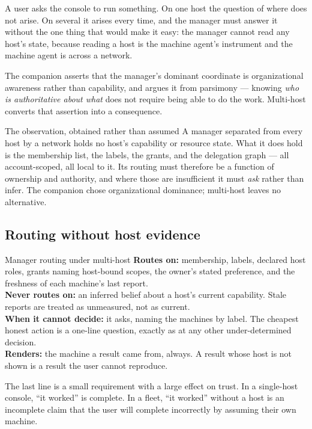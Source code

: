 \documentclass[11pt]{article}
\begin{document}
A user asks the console to run something. On one host the question of where does not arise. On several it arises every time, and the manager must answer it without the one thing that would make it easy: the manager cannot read any host's state, because reading a host is the machine agent's instrument and the machine agent is across a network.

The companion asserts that the manager's dominant coordinate is organizational awareness rather than capability, and argues it from parsimony --- knowing \emph{who is authoritative about what} does not require being able to do the work. Multi-host converts that assertion into a consequence.

\begin{claimbox}{The observation, obtained rather than assumed}
A manager separated from every host by a network holds no host's capability or resource state. What it does hold is the membership list, the labels, the grants, and the delegation graph --- all account-scoped, all local to it. Its routing must therefore be a function of ownership and authority, and where those are insufficient it must \emph{ask} rather than infer. The companion chose organizational dominance; multi-host leaves no alternative.
\end{claimbox}

\subsection{Routing without host evidence}

\begin{specbox}{Manager routing under multi-host}
\textbf{Routes on:} membership, labels, declared host roles, grants naming host-bound scopes, the owner's stated preference, and the freshness of each machine's last report.\\[3pt]
\textbf{Never routes on:} an inferred belief about a host's current capability. Stale reports are treated as unmeasured, not as current.\\[3pt]
\textbf{When it cannot decide:} it asks, naming the machines by label. The cheapest honest action is a one-line question, exactly as at any other under-determined decision.\\[3pt]
\textbf{Renders:} the machine a result came from, always. A result whose host is not shown is a result the user cannot reproduce.
\end{specbox}

The last line is a small requirement with a large effect on trust. In a single-host console, ``it worked'' is complete. In a fleet, ``it worked'' without a host is an incomplete claim that the user will complete incorrectly by assuming their own machine.
\end{document}
